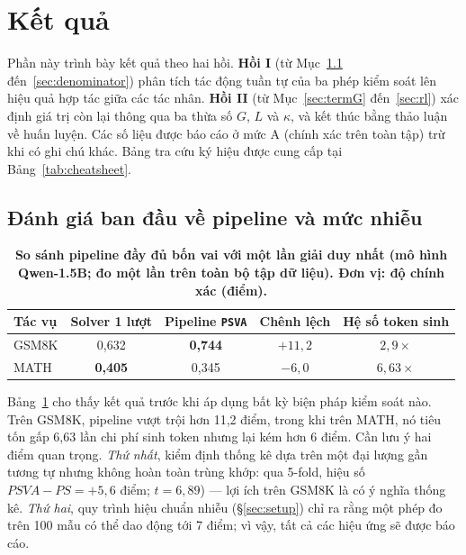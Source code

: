 \documentclass[12pt,a4paper]{article}
\begin{document}
\section{Kết quả}\label{sec:results}

Phần này trình bày kết quả theo hai hồi. \textbf{Hồi I} (từ Mục~\ref{sec:start} đến~\ref{sec:denominator}) phân tích tác động tuần tự của ba phép kiểm soát lên hiệu quả hợp tác giữa các tác nhân. \textbf{Hồi II} (từ Mục~\ref{sec:termG} đến~\ref{sec:rl}) xác định giá trị còn lại thông qua ba thừa số \(G\), \(L\) và \(\kappa\), và kết thúc bằng thảo luận về huấn luyện. Các số liệu được báo cáo ở mức A (chính xác trên toàn tập) trừ khi có ghi chú khác. Bảng tra cứu ký hiệu được cung cấp tại Bảng~\ref{tab:cheatsheet}.

\subsection{Đánh giá ban đầu về pipeline và mức nhiễu}\label{sec:start}

\begin{table}[h]\centering\small
\begin{tabular}{@{}l c c c c@{}}
\toprule
Tác vụ & Solver 1 lượt & Pipeline \texttt{PSVA} & Chênh lệch & Hệ số token sinh\\
\midrule
GSM8K & 0,632 & \textbf{0,744} & \(+11{,}2\) & \(2{,}9\times\)\\
MATH  & \textbf{0,405} & 0,345 & \(-6{,}0\) & \(6{,}63\times\)\\
\bottomrule
\end{tabular}
\caption{\textbf{So sánh pipeline đầy đủ bốn vai với một lần giải duy nhất (mô hình Qwen-1.5B; đo một lần trên toàn bộ tập dữ liệu). Đơn vị: độ chính xác (điểm).}}
\label{tab:pipeline}
\end{table}

Bảng~\ref{tab:pipeline} cho thấy kết quả trước khi áp dụng bất kỳ biện pháp kiểm soát nào. Trên GSM8K, pipeline vượt trội hơn 11,2 điểm, trong khi trên MATH, nó tiêu tốn gấp 6,63 lần chi phí sinh token nhưng lại kém hơn 6 điểm. Cần lưu ý hai điểm quan trọng. \textit{Thứ nhất}, kiểm định thống kê dựa trên một đại lượng gần tương tự nhưng không hoàn toàn trùng khớp: qua 5-fold, hiệu số \(\textit{PSVA}-\textit{PS} = +5{,}6\) điểm; \(t=6{,}89\)) --- lợi ích trên GSM8K là có ý nghĩa thống kê. \textit{Thứ hai}, quy trình hiệu chuẩn nhiễu (\S\ref{sec:setup}) chỉ ra rằng một phép đo trên 100 mẫu có thể dao động tới 7 điểm; vì vậy, tất cả các hiệu ứng sẽ được báo cáo.
\end{document}
